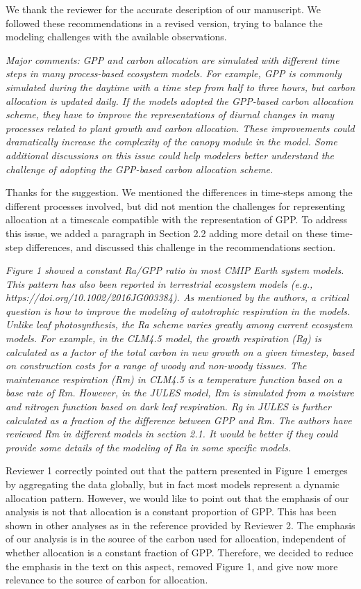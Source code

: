 We thank the reviewer for the accurate description of our manuscript. We
followed these recommendations in a revised version, trying to balance
the modeling challenges with the available observations.

\emph{Major comments:} \emph{GPP and carbon allocation are simulated
with different time steps in many process-based ecosystem models. For
example, GPP is commonly simulated during the daytime with a time step
from half to three hours, but carbon allocation is updated daily. If the
models adopted the GPP-based carbon allocation scheme, they have to
improve the representations of diurnal changes in many processes related
to plant growth and carbon allocation. These improvements could
dramatically increase the complexity of the canopy module in the model.
Some additional discussions on this issue could help modelers better
understand the challenge of adopting the GPP-based carbon allocation
scheme.}

Thanks for the suggestion. We mentioned the differences in time-steps
among the different processes involved, but did not mention the
challenges for representing allocation at a timescale compatible with
the representation of GPP. To address this issue, we added a paragraph
in Section 2.2 adding more detail on these time-step differences, and
discussed this challenge in the recommendations section.

\emph{Figure 1 showed a constant Ra/GPP ratio in most CMIP Earth system
models. This pattern has also been reported in terrestrial ecosystem
models (e.g., https://doi.org/10.1002/2016JG003384). As mentioned by the
authors, a critical question is how to improve the modeling of
autotrophic respiration in the models. Unlike leaf photosynthesis, the
Ra scheme varies greatly among current ecosystem models. For example, in
the CLM4.5 model, the growth respiration (Rg) is calculated as a factor
of the total carbon in new growth on a given timestep, based on
construction costs for a range of woody and non-woody tissues. The
maintenance respiration (Rm) in CLM4.5 is a temperature function based
on a base rate of Rm. However, in the JULES model, Rm is simulated from
a moisture and nitrogen function based on dark leaf respiration. Rg in
JULES is further calculated as a fraction of the difference between GPP
and Rm. The authors have reviewed Rm in different models in section 2.1.
It would be better if they could provide some details of the modeling of
Ra in some specific models.}

Reviewer 1 correctly pointed out that the pattern presented in Figure 1
emerges by aggregating the data globally, but in fact most models
represent a dynamic allocation pattern. However, we would like to point
out that the emphasis of our analysis is not that allocation is a
constant proportion of GPP. This has been shown in other analyses as in
the reference provided by Reviewer 2. The emphasis of our analysis is in
the source of the carbon used for allocation, independent of whether
allocation is a constant fraction of GPP. Therefore, we decided to
reduce the emphasis in the text on this aspect, removed Figure 1, and
give now more relevance to the source of carbon for allocation.

